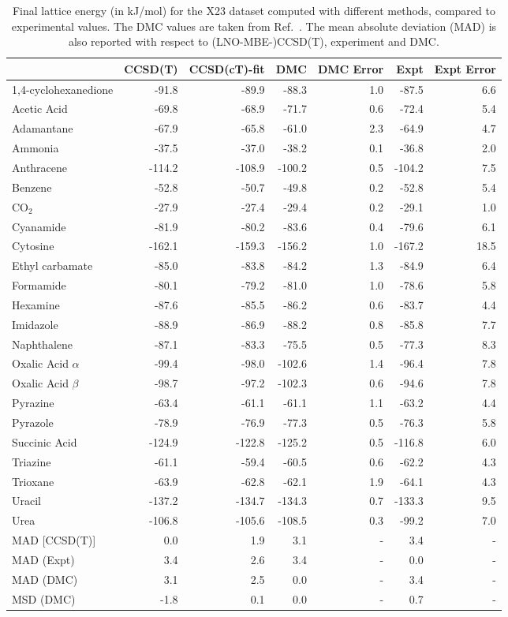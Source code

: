 \begin{table}[h]

\caption{\label{tab:x23_final_compare}Final lattice energy (in kJ/mol) for the X23 dataset computed with different methods, compared to experimental values. The DMC values are taken from Ref.~. The mean absolute deviation (MAD) is also reported with respect to (LNO-MBE-)CCSD(T), experiment and DMC.}
\begin{tabular}{lrrrrrr}
\toprule
 & CCSD(T) & CCSD(cT)-fit & DMC & DMC Error & Expt & Expt Error \\ 
\midrule
1,4-cyclohexanedione & -91.8 & -89.9 & -88.3 & 1.0 & -87.5 & 6.6 \\
Acetic Acid & -69.8 & -68.9 & -71.7 & 0.6 & -72.4 & 5.4 \\
Adamantane & -67.9 & -65.8 & -61.0 & 2.3 & -64.9 & 4.7 \\
Ammonia & -37.5 & -37.0 & -38.2 & 0.1 & -36.8 & 2.0 \\
Anthracene & -114.2 & -108.9 & -100.2 & 0.5 & -104.2 & 7.5 \\
Benzene & -52.8 & -50.7 & -49.8 & 0.2 & -52.8 & 5.4 \\
CO$_2$ & -27.9 & -27.4 & -29.4 & 0.2 & -29.1 & 1.0 \\
Cyanamide & -81.9 & -80.2 & -83.6 & 0.4 & -79.6 & 6.1 \\
Cytosine & -162.1 & -159.3 & -156.2 & 1.0 & -167.2 & 18.5 \\
Ethyl carbamate & -85.0 & -83.8 & -84.2 & 1.3 & -84.9 & 6.4 \\
Formamide & -80.1 & -79.2 & -81.0 & 1.0 & -78.6 & 5.8 \\
Hexamine & -87.6 & -85.5 & -86.2 & 0.6 & -83.7 & 4.4 \\
Imidazole & -88.9 & -86.9 & -88.2 & 0.8 & -85.8 & 7.7 \\
Naphthalene & -87.1 & -83.3 & -75.5 & 0.5 & -77.3 & 8.3 \\
Oxalic Acid $\alpha$ & -99.4 & -98.0 & -102.6 & 1.4 & -96.4 & 7.8 \\
Oxalic Acid $\beta$ & -98.7 & -97.2 & -102.3 & 0.6 & -94.6 & 7.8 \\
Pyrazine & -63.4 & -61.1 & -61.1 & 1.1 & -63.2 & 4.4 \\
Pyrazole & -78.9 & -76.9 & -77.3 & 0.5 & -76.3 & 5.8 \\
Succinic Acid & -124.9 & -122.8 & -125.2 & 0.5 & -116.8 & 6.0 \\
Triazine & -61.1 & -59.4 & -60.5 & 0.6 & -62.2 & 4.3 \\
Trioxane & -63.9 & -62.8 & -62.1 & 1.9 & -64.1 & 4.3 \\
Uracil & -137.2 & -134.7 & -134.3 & 0.7 & -133.3 & 9.5 \\
Urea & -106.8 & -105.6 & -108.5 & 0.3 & -99.2 & 7.0 \\
MAD [CCSD(T)] & 0.0 & 1.9 & 3.1 & - & 3.4 & - \\
MAD (Expt) & 3.4 & 2.6 & 3.4 & - & 0.0 & - \\
MAD (DMC) & 3.1 & 2.5 & 0.0 & - & 3.4 & - \\
MSD (DMC) & -1.8 & 0.1 & 0.0 & - & 0.7 & - \\
\bottomrule
\end{tabular}

\end{table}